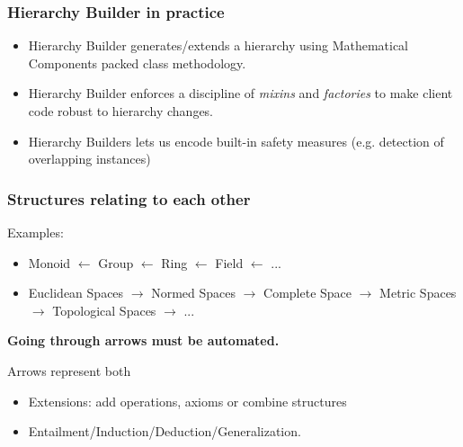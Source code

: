 \documentclass[11pt]{beamer}
\def\mathcomp{{\small\textsc{Mathematical Components}}}
\def\mathcomp{{\sc Mathematical Components}}
\begin{document}
\begin{frame}
  \frametitle{Hierarchy Builder in practice}

  \begin{itemize}
  \item Hierarchy Builder generates/extends a hierarchy using \mathcomp{}
    packed class methodology.
    \vfill
  \item Hierarchy Builder enforces a discipline of \emph{mixins} and
    \emph{factories} to make client code robust to hierarchy changes.
    \vfill
  \item Hierarchy Builders lets us encode built-in safety measures
    (e.g. detection of overlapping instances)
  \end{itemize}
\end{frame}


\begin{frame}[fragile]
  \frametitle{Structures relating to each other}

  Examples:

  \begin{itemize}
  \item Monoid $\leftarrow$ Group $\leftarrow$ Ring $\leftarrow$ Field
    $\leftarrow$ ...


  \item Euclidean Spaces $\rightarrow$ Normed Spaces $\rightarrow$
    Complete Space $\rightarrow$ Metric Spaces $\rightarrow$ Topological
    Spaces $\rightarrow$ ...

  \end{itemize}

  \pause
  \vfill{}

  \textbf{Going through arrows must be automated.}

  \pause
  \vfill{}

  Arrows represent both
  \begin{itemize}
  \item Extensions: add operations, axioms or combine structures
  \item Entailment/Induction/Deduction/Generalization.
  \end{itemize}

\end{frame}
\end{document}
